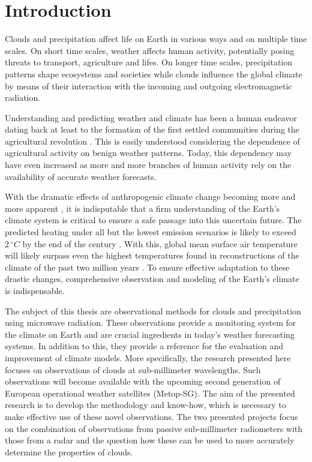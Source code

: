 
\chapter{Introduction}

Clouds and precipitation affect life on Earth in various ways and on multiple
time scales. On short time scales, weather affects human activity, potentially
posing threats to transport, agriculture and lifes. On longer time scales,
precipitation patterns shape ecosystems and societies while clouds influence the
global climate by means of their interaction with the incoming and outgoing
electromagnetic radiation.

Understanding and predicting weather and climate has been a human endeavor
dating back at least to the formation of the first settled communities during
the agricultural revolution \parencite{hellmann08}. This is easily understood
considering the dependence of agricultural activity on benign weather patterns.
Today, this dependency may have even increased as more and more branches of
human activity rely on the availability of accurate weather forecasts.

With the dramatic effects of anthropogenic climate change becoming more and more
apparent \cite{coronese19, grinsted19}, it is indisputable that a firm
understanding of the Earth's climate system is critical to ensure a safe passage
into this uncertain future. The predicted heating under all but the lowest
emission scenarios is likely to exceed $2\ \unit{^\circ C}$ by the end of the
century \cite{collins13}. With this, global mean surface air temperature will
likely surpass even the highest temperatures found in reconstructions of the
climate of the past two million years \cite{delmotte13}. To ensure effective
adaptation to these drastic changes, comprehensive observation and modeling of
the Earth's climate is indispensable.

The subject of this thesis are observational methods for clouds and
precipitation using microwave radiation. These observations provide a monitoring
system for the climate on Earth and are crucial ingredients in today's weather
forecasting systems. In addition to this, they provide a reference for the
evaluation and improvement of climate models. More specifically, the research
presented here focuses on observations of clouds at sub-millimeter wavelengths.
Such observations will become available with the upcoming second generation of
European operational weather satellites (Metop-SG). The aim of the presented
research is to develop the methodology and know-how, which is necessary to make effective
use of these novel observations. The two presented projects focus on the
combination of observations from passive sub-millimeter radiometers with those
from a radar and the question how these can be used to more accurately determine
the properties of clouds.

